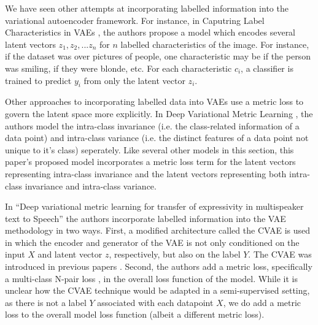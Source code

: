 \documentclass[./dissertation.tex]{subfiles}
\begin{document}
    We have seen other attempts at incorporating labelled information into the variational autoencoder framework. For instance, in Caputring Label Characteristics in VAEs \cite{joy2020capturing}, the authors propose a model which encodes several latent vectors $z_{1}, z_{2}, ... z_{n}$ for $n$ labelled characteristics of the image. For instance, if the dataset was over pictures of people, one characteristic may be if the person was smiling, if they were blonde, etc. For each characteristic $c_{i}$, a classifier is trained to predict $y_{i}$ from only the latent vector $z_{i}$. 

Other approaches to incorporating labelled data into VAEs use a metric loss to govern the latent space more explicitly. In Deep Variational Metric Learning \cite{lin2018deep}, the authors model the intra-class invariance (i.e. the class-related information of a data point) and intra-class variance (i.e. the distinct features of a data point not unique to it's class) seperately. Like several other models in this section, this paper's proposed model incorporates a metric loss term for the latent vectors representing intra-class invariance and the latent vectors representing both intra-class invariance and intra-class variance.

In ``Deep variational metric learning for transfer of expressivity in multispeaker text to Speech'' \cite{kulkarni2020deep} the authors incorporate labelled information into the VAE methodology in two ways. First, a modified architecture called the CVAE is used in which the encoder and generator of the VAE is not only conditioned on the input $X$ and latent vector $z$, respectively, but also on the label $Y$. The CVAE was introduced in previous papers \cite{sohn2015learning} \cite{dahmani2019conditional}. Second, the authors add a metric loss, specifically a multi-class N-pair loss \cite{sohn2016improved}, in the overall loss function of the model. While it is unclear how the CVAE technique would be adapted in a semi-supervised setting, as there is not a label $Y$ associated with each datapoint $X$, we do add a metric loss to the overall model loss function (albeit a different metric loss).
    
    \lipsum[7]
    
\end{document}
